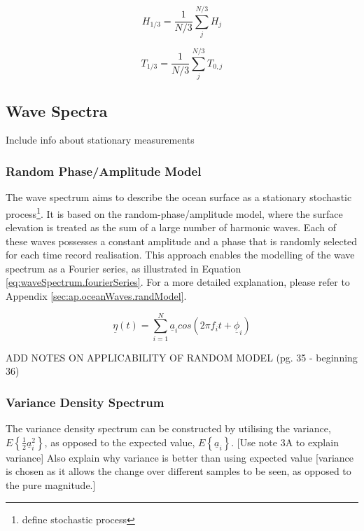 \begin{equation} \label{eq:waves.sigH}
    H_{1/3} = \frac{1}{N/3}\sum_{j}^{N/3}H_{j}
\end{equation}

\begin{equation} \label{eq:waves.sigT}
    T_{1/3} = \frac{1}{N/3}\sum_{j}^{N/3}T_{0,j}
\end{equation}

\subsection{Wave Spectra} \label{subsec:theory.waves.waveSpectrum}
Include info about stationary measurements
\subsubsection{Random Phase/Amplitude Model} \label{subsec:theory.waves.waveSpectrum.randModel}

The wave spectrum aims to describe the ocean surface as a stationary stochastic process\footnote{define stochastic process}. It is based on the random-phase/amplitude model, where the surface elevation is treated as the sum of a large number of harmonic waves. Each of these waves possesses a constant amplitude and a phase that is randomly selected for each time record realisation. This approach enables the modelling of the wave spectrum as a Fourier series, as illustrated in Equation \ref{eq:waveSpectrum.fourierSeries}. For a more detailed explanation, please refer to Appendix \ref{sec:ap.oceanWaves.randModel}.

\begin{equation} \label{eq:waveSpectrum.fourierSeries}
    \underline{\eta}(t) = \sum_{i=1}^{N}\underline{a}_{i}cos(2\pi f_{i}t + \underline{\phi}_{i})
\end{equation}

ADD NOTES ON APPLICABILITY OF RANDOM MODEL (pg. 35 - beginning 36)

\subsubsection{Variance Density Spectrum} \label{subsec:theory.waves.waveSpectrum.varianceSpectrum}

The variance density spectrum can be constructed by utilising the variance, $E\left \{  \frac{1}{2}\underline{a}^{2}_{i}\right \}$, as opposed to the expected value, $E\left \{  \underline{a}_{i}\right \}$. [Use note 3A to explain variance] Also explain why variance is better than using expected value [variance is chosen as it allows the change over different samples to be seen, as opposed to the pure magnitude.]

